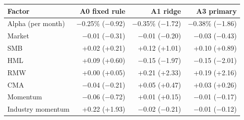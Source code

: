 \begin{tabular}{lrrr}
\toprule
Factor & A0 fixed rule & A1 ridge & A3 primary \\
\midrule
Alpha (per month) & $-$0.25\% ($-$0.92) & $-$0.35\% ($-$1.72) & $-$0.38\% ($-$1.86) \\
Market & $-$0.01 ($-$0.31) & $-$0.01 ($-$0.20) & $-$0.03 ($-$0.43) \\
SMB & +0.02 (+0.21) & +0.12 (+1.01) & +0.10 (+0.89) \\
HML & +0.09 (+0.60) & $-$0.15 ($-$1.97) & $-$0.15 ($-$2.01) \\
RMW & +0.00 (+0.05) & +0.21 (+2.33) & +0.19 (+2.16) \\
CMA & $-$0.04 ($-$0.21) & +0.05 (+0.47) & +0.03 (+0.26) \\
Momentum & $-$0.06 ($-$0.72) & +0.01 (+0.15) & $-$0.01 ($-$0.17) \\
Industry momentum & +0.22 (+1.93) & $-$0.02 ($-$0.21) & $-$0.01 ($-$0.12) \\
\bottomrule
\end{tabular}
